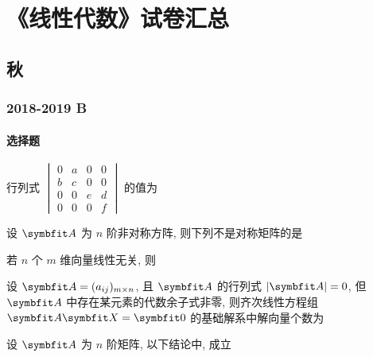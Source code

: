 \chapter{《线性代数》试卷汇总}
\section{秋}
\subsection{2018-2019 B}
\subsubsection{选择题}
\begin{ti}
	行列式 $\begin{vmatrix}
		0 & a & 0 & 0 \\
		b & c & 0 & 0 \\
		0 & 0 & e & d \\
		0 & 0 & 0 & f
	\end{vmatrix}$ 的值为 \kuo
\end{ti}

\begin{ti}
	设 $\bA$ 为 $n$ 阶非对称方阵, 则下列不是对称矩阵的是 \kuo
	\fourch{$\bA \bA^{\TT}$}{$\bA - \bA^{\TT}$}{$\bA + \bA^{\TT}$}{$\bA \bA^{\TT}$}
\end{ti}

\begin{ti}
	若 $n$ 个 $m$ 维向量线性无关, 则 \kuo
\end{ti}

\begin{ti}
	设 $\bA = (a_{ij})_{m \times n}$, 且 $\bA$ 的行列式 $|\bA| = 0$, 但 $\bA$ 中存在某元素的代数余子式非零, 则齐次线性方程组 $\bA \bX = \symbfit 0$ 的基础解系中解向量个数为 \kuo
\end{ti}

\begin{ti}
	设 $\bA$ 为 $n$ 阶矩阵, 以下结论中, \kuo{} 成立
\end{ti}

